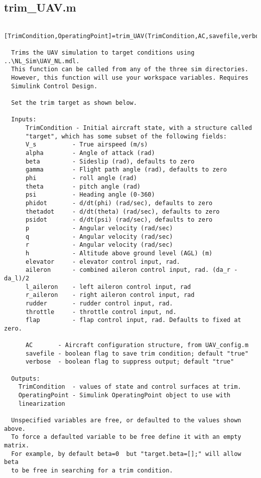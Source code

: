 \documentclass[12pt]{article}
\begin{document}
\subsection{trim\_UAV.m}
\begin{verbatim}
 [TrimCondition,OperatingPoint]=trim_UAV(TrimCondition,AC,savefile,verbose)
 
  Trims the UAV simulation to target conditions using ..\NL_Sim\UAV_NL.mdl.
  This function can be called from any of the three sim directories.
  However, this function will use your workspace variables. Requires 
  Simulink Control Design.
 
  Set the trim target as shown below.
 
  Inputs:
      TrimCondition - Initial aircraft state, with a structure called
      "target", which has some subset of the following fields:
      V_s          - True airspeed (m/s)
      alpha        - Angle of attack (rad)
      beta         - Sideslip (rad), defaults to zero
      gamma        - Flight path angle (rad), defaults to zero
      phi          - roll angle (rad)
      theta        - pitch angle (rad)
      psi          - Heading angle (0-360)
      phidot       - d/dt(phi) (rad/sec), defaults to zero
      thetadot     - d/dt(theta) (rad/sec), defaults to zero
      psidot       - d/dt(psi) (rad/sec), defaults to zero
      p            - Angular velocity (rad/sec)
      q            - Angular velocity (rad/sec)
      r            - Angular velocity (rad/sec)
      h            - Altitude above ground level (AGL) (m)
      elevator     - elevator control input, rad. 
      aileron      - combined aileron control input, rad. (da_r - da_l)/2
      l_aileron    - left aileron control input, rad
      r_aileron    - right aileron control input, rad
      rudder       - rudder control input, rad. 
      throttle     - throttle control input, nd. 
      flap         - flap control input, rad. Defaults to fixed at zero.
 
      AC       - Aircraft configuration structure, from UAV_config.m
      savefile - boolean flag to save trim condition; default "true"
      verbose  - boolean flag to suppress output; default "true"
 
  Outputs:
    TrimCondition  - values of state and control surfaces at trim.
    OperatingPoint - Simulink OperatingPoint object to use with
    linearization
 
  Unspecified variables are free, or defaulted to the values shown above.
  To force a defaulted variable to be free define it with an empty matrix.
  For example, by default beta=0  but "target.beta=[];" will allow beta
  to be free in searching for a trim condition.
 

\end{verbatim}
\end{document}

